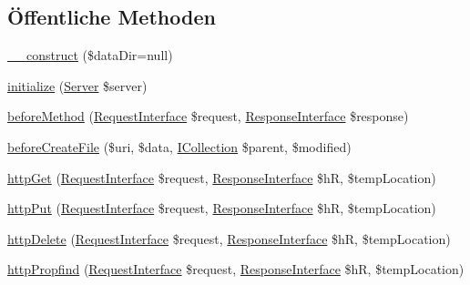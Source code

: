 \subsection*{Öffentliche Methoden}
\begin{DoxyCompactItemize}
\item 
\mbox{\hyperlink{class_sabre_1_1_d_a_v_1_1_temporary_file_filter_plugin_a762fe944736fc5eb23a8de3d5a2582d9}{\+\_\+\+\_\+construct}} (\$data\+Dir=null)
\item 
\mbox{\hyperlink{class_sabre_1_1_d_a_v_1_1_temporary_file_filter_plugin_a4348c841bd5edb67a52fa9d5d18bdefa}{initialize}} (\mbox{\hyperlink{class_sabre_1_1_d_a_v_1_1_server}{Server}} \$server)
\item 
\mbox{\hyperlink{class_sabre_1_1_d_a_v_1_1_temporary_file_filter_plugin_a693a9809f2410fb0099e63abed9e334d}{before\+Method}} (\mbox{\hyperlink{interface_sabre_1_1_h_t_t_p_1_1_request_interface}{Request\+Interface}} \$request, \mbox{\hyperlink{interface_sabre_1_1_h_t_t_p_1_1_response_interface}{Response\+Interface}} \$response)
\item 
\mbox{\hyperlink{class_sabre_1_1_d_a_v_1_1_temporary_file_filter_plugin_a898e57067feb939319b25e8432459c79}{before\+Create\+File}} (\$uri, \$data, \mbox{\hyperlink{interface_sabre_1_1_d_a_v_1_1_i_collection}{I\+Collection}} \$parent, \$modified)
\item 
\mbox{\hyperlink{class_sabre_1_1_d_a_v_1_1_temporary_file_filter_plugin_aba5aac1b4d8f285c393e9a0c8f21a100}{http\+Get}} (\mbox{\hyperlink{interface_sabre_1_1_h_t_t_p_1_1_request_interface}{Request\+Interface}} \$request, \mbox{\hyperlink{interface_sabre_1_1_h_t_t_p_1_1_response_interface}{Response\+Interface}} \$hR, \$temp\+Location)
\item 
\mbox{\hyperlink{class_sabre_1_1_d_a_v_1_1_temporary_file_filter_plugin_a630c7e3321fcdecfa1411afa5df4976d}{http\+Put}} (\mbox{\hyperlink{interface_sabre_1_1_h_t_t_p_1_1_request_interface}{Request\+Interface}} \$request, \mbox{\hyperlink{interface_sabre_1_1_h_t_t_p_1_1_response_interface}{Response\+Interface}} \$hR, \$temp\+Location)
\item 
\mbox{\hyperlink{class_sabre_1_1_d_a_v_1_1_temporary_file_filter_plugin_a76eb0e2c6608bfbea0da86ff4dc83992}{http\+Delete}} (\mbox{\hyperlink{interface_sabre_1_1_h_t_t_p_1_1_request_interface}{Request\+Interface}} \$request, \mbox{\hyperlink{interface_sabre_1_1_h_t_t_p_1_1_response_interface}{Response\+Interface}} \$hR, \$temp\+Location)
\item 
\mbox{\hyperlink{class_sabre_1_1_d_a_v_1_1_temporary_file_filter_plugin_a567e0f9723b210d6076b25c7c7056cc0}{http\+Propfind}} (\mbox{\hyperlink{interface_sabre_1_1_h_t_t_p_1_1_request_interface}{Request\+Interface}} \$request, \mbox{\hyperlink{interface_sabre_1_1_h_t_t_p_1_1_response_interface}{Response\+Interface}} \$hR, \$temp\+Location)
\end{DoxyCompactItemize}
